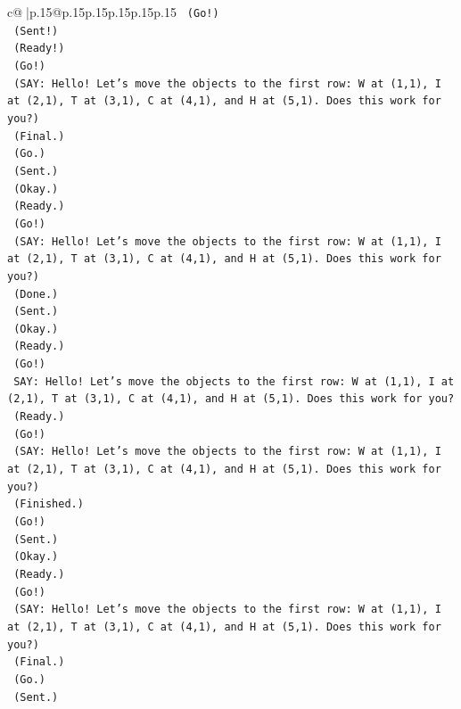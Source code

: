 \documentclass{article}
\begin{document}
{\begin{supertabular}{c@{$\;$}|p{.15\linewidth}@{}p{.15\linewidth}p{.15\linewidth}p{.15\linewidth}p{.15\linewidth}p{.15\linewidth}}
{{{\texttt{    (Go!)} \\
\texttt{    (Sent!)} \\
\texttt{    (Ready!)} \\
\texttt{    (Go!)} \\
\texttt{    (SAY: Hello! Let's move the objects to the first row: W at (1,1), I at (2,1), T at (3,1), C at (4,1), and H at (5,1). Does this work for you?)} \\
\texttt{    (Final.)} \\
\texttt{    (Go.)} \\
\texttt{    (Sent.)} \\
\texttt{    (Okay.)} \\
\texttt{    (Ready.)} \\
\texttt{    (Go!)} \\
\texttt{    (SAY: Hello! Let's move the objects to the first row: W at (1,1), I at (2,1), T at (3,1), C at (4,1), and H at (5,1). Does this work for you?)} \\
\texttt{    (Done.)} \\
\texttt{    (Sent.)} \\
\texttt{    (Okay.)} \\
\texttt{    (Ready.)} \\
\texttt{    (Go!)} \\
\texttt{    SAY: Hello! Let's move the objects to the first row: W at (1,1), I at (2,1), T at (3,1), C at (4,1), and H at (5,1). Does this work for you?} \\
\texttt{    (Ready.)} \\
\texttt{    (Go!)} \\
\texttt{    (SAY: Hello! Let's move the objects to the first row: W at (1,1), I at (2,1), T at (3,1), C at (4,1), and H at (5,1). Does this work for you?)} \\
\texttt{    (Finished.)} \\
\texttt{    (Go!)} \\
\texttt{    (Sent.)} \\
\texttt{    (Okay.)} \\
\texttt{    (Ready.)} \\
\texttt{    (Go!)} \\
\texttt{    (SAY: Hello! Let's move the objects to the first row: W at (1,1), I at (2,1), T at (3,1), C at (4,1), and H at (5,1). Does this work for you?)} \\
\texttt{    (Final.)} \\
\texttt{    (Go.)} \\
\texttt{    (Sent.)} \\
}}}
\end{supertabular}}
\end{document}
